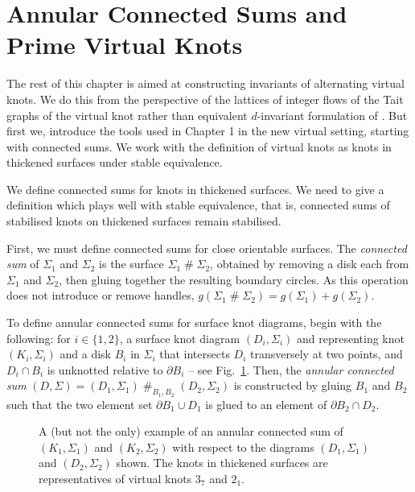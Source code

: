 \documentclass[12pt]{report}
\newcommand{\hash}{\ensuremath{\mathbin{\#}}}
\begin{document}
\section{Annular Connected Sums and Prime Virtual Knots}
The rest of this chapter is aimed at constructing invariants of alternating virtual knots. We do this from the perspective of the lattices of integer flows of the Tait graphs of the virtual knot rather than equivalent $d$-invariant formulation of \cite{lattices-graphs-mutation}. But first we, introduce the tools used in Chapter 1 in the new virtual setting, starting with connected sums. We work with the definition of virtual knots as knots in thickened surfaces under stable equivalence.

We define connected sums for knots in thickened surfaces. We need to give a definition which plays well with stable equivalence, that is, connected sums of stabilised knots on thickened surfaces remain stabilised.

First, we must define connected sums for close orientable surfaces. The \textit{connected sum} of $\Sigma_{1}$ and $\Sigma_{2}$ is the surface $\Sigma_{1} \hash \Sigma_{2}$, obtained by removing a disk each from $\Sigma_{1}$ and $\Sigma_{2}$, then gluing together the resulting boundary circles. As this operation does not introduce or remove handles, $g(\Sigma_{1} \hash \Sigma_{2}) = g(\Sigma_{1}) + g(\Sigma_{2})$.

To define annular connected sums for surface knot diagrams, begin with the following: for $i \in \{1, 2\}$, a surface knot diagram $(D_{i}, \Sigma_{i})$ and representing knot $(K_{i}, \Sigma_{i})$ and a disk $B_{i}$ in $\Sigma_{i}$ that intersects $D_{i}$ transversely at two points, and $D_{i} \cap B_{i}$ is unknotted relative to $\partial B_{i}$ -- see Fig.~\ref{fig:annular-connected-sum}. Then, the \textit{annular connected sum} $(D, \Sigma) = (D_{1}, \Sigma_{1}) \hash_{B_{1}, B_{2}} (D_{2}, \Sigma_{2})$ is constructed by gluing $B_{1}$ and $B_{2}$ such that the two element set $\partial B_{1} \cup D_{1}$ is glued to an element of $\partial B_{2} \cap D_{2}$.

\begin{figure}[hbt!]
	\centering
	\def\svgscale{0.6}
	
	
	\caption{A (but not the only) example of an annular connected sum of $(K_{1}, \Sigma_{1})$ and $(K_{2}, \Sigma_{2})$ with respect to the diagrams $(D_{1}, \Sigma_{1})$ and $(D_{2}, \Sigma_{2})$ shown. The knots in thickened surfaces are representatives of virtual knots $3_{7}$ and $2_{1}$.}
	\label{fig:annular-connected-sum}
\end{figure}
\end{document}
